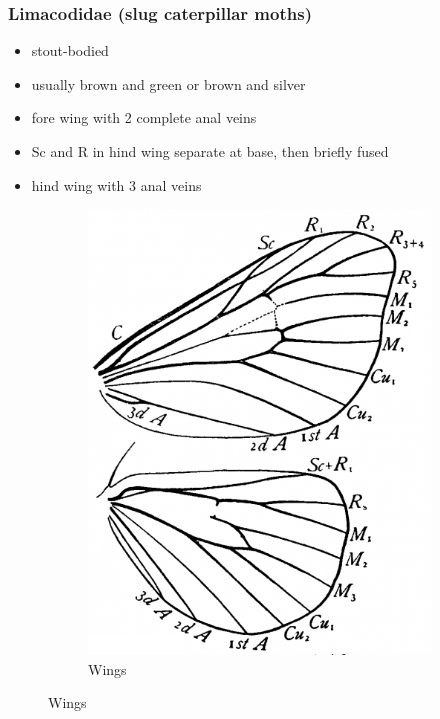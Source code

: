 \documentclass[letterpaper, 11pt]{article}
\begin{document}
\subsubsection{Limacodidae (slug caterpillar moths)}
\begin{itemize}
\item stout-bodied
\item usually brown and green or brown and silver
\item fore wing with 2 complete anal veins
\item Sc and R in hind wing separate at base, then briefly fused 
\item hind wing with 3 anal veins
\end{itemize}

\begin{figure}[ht!]
    \centering
    \begin{subfigure}[ht!]{0.35\textwidth}
        \includegraphics[width=\textwidth]{LimacodidWings}
        \caption{Wings \citep[Fig. 349]{comstock1918wings}}

\end{subfigure}
\end{figure}
\end{document}
